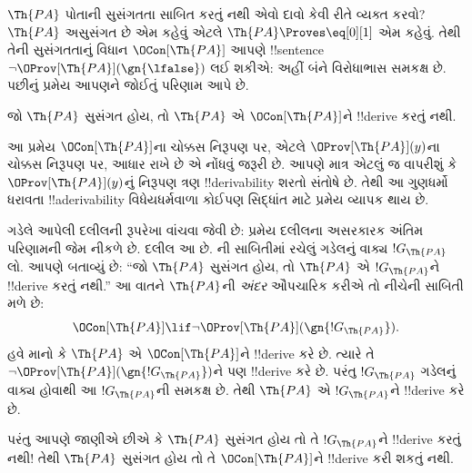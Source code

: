 \documentclass[../../../include/open-logic-section]{subfiles}
\begin{document}


$\Th{PA}$ પોતાની સુસંગતતા સાબિત કરતું નથી એવો દાવો કેવી રીતે વ્યક્ત કરવો? $\Th{PA}$ અસુસંગત છે એમ કહેવું એટલે $\Th{PA} \Proves \eq[0][1]$ એમ કહેવું. તેથી તેની સુસંગતતાનું વિધાન $\OCon[\Th{PA}]$ આપણે !!{sentence} $\lnot\OProv[\Th{PA}](\gn{\lfalse})$ લઈ શકીએ: અહીં બંને વિરોધાભાસ સમકક્ષ છે. પછીનું પ્રમેય આપણને જોઈતું પરિણામ આપે છે.

\begin{thm}
જો $\Th{PA}$ સુસંગત હોય, તો $\Th{PA}$ એ $\OCon[\Th{PA}]$ને !!{derive} કરતું નથી.
\end{thm}

આ પ્રમેય $\OCon[\Th{PA}]$ના ચોક્કસ નિરૂપણ પર, એટલે $\OProv[\Th{PA}](y)$ના ચોક્કસ નિરૂપણ પર, આધાર રાખે છે એ નોંધવું જરૂરી છે. આપણે માત્ર એટલું જ વાપરીશું કે $\OProv[\Th{PA}](y)$નું નિરૂપણ ત્રણ !!{derivability} શરતો સંતોષે છે. તેથી આ ગુણધર્મો ધરાવતા !!a{derivability} વિધેયધર્મવાળા કોઈપણ સિદ્ધાંત માટે પ્રમેય વ્યાપક થાય છે.

ગડેલે આપેલી દલીલની રૂપરેખા વાંચવા જેવી છે: પ્રમેય દલીલના અસરકારક અંતિમ પરિણામની જેમ નીકળે છે. દલીલ આ છે. ની સાબિતીમાં રચેલું ગડેલનું વાક્ય $!G_\Th{PA}$ લો. આપણે બતાવ્યું છે: ``જો $\Th{PA}$ સુસંગત હોય, તો $\Th{PA}$ એ $!G_\Th{PA}$ને !!{derive} કરતું નથી.'' આ વાતને $\Th{PA}$ની \emph{અંદર} ઔપચારિક કરીએ તો નીચેની સાબિતી મળે છે:
\[
\OCon[\Th{PA}] \lif \lnot \OProv[\Th{PA}](\gn{!G_\Th{PA}}).
\]
હવે માનો કે $\Th{PA}$ એ $\OCon[\Th{PA}]$ને !!{derive} કરે છે. ત્યારે તે $\lnot\OProv[\Th{PA}](\gn{!G_\Th{PA}})$ને પણ !!{derive} કરે છે. પરંતુ $!G_\Th{PA}$ ગડેલનું વાક્ય હોવાથી આ $!G_\Th{PA}$ની સમકક્ષ છે. તેથી $\Th{PA}$ એ $!G_\Th{PA}$ને !!{derive} કરે છે.

પરંતુ આપણે જાણીએ છીએ કે $\Th{PA}$ સુસંગત હોય તો તે $!G_\Th{PA}$ને !!{derive} કરતું નથી!{} તેથી $\Th{PA}$ સુસંગત હોય તો તે $\OCon[\Th{PA}]$ને !!{derive} કરી શકતું નથી.
\end{document}

